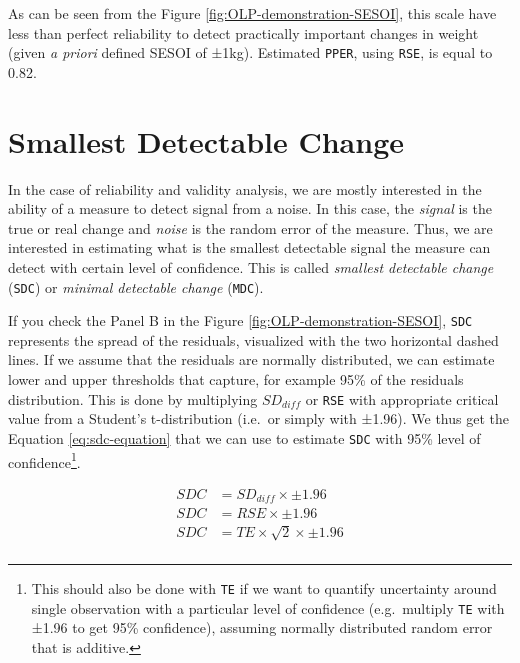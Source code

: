 \documentclass[
]{book}
\begin{document}
As can be seen from the Figure \ref{fig:OLP-demonstration-SESOI}, this scale have less than perfect reliability to detect practically important changes in weight (given \emph{a priori} defined SESOI of ±1kg). Estimated \texttt{PPER}, using \texttt{RSE}, is equal to 0.82.

\hypertarget{smallest-detectable-change}{%
\section{Smallest Detectable Change}\label{smallest-detectable-change}}

In the case of reliability and validity analysis, we are mostly interested in the ability of a measure to detect signal from a noise. In this case, the \emph{signal} is the true or real change and \emph{noise} is the random error of the measure. Thus, we are interested in estimating what is the smallest detectable signal the measure can detect with certain level of confidence. This is called \emph{smallest detectable change} (\texttt{SDC}) or \emph{minimal detectable change} (\texttt{MDC}).

If you check the Panel B in the Figure \ref{fig:OLP-demonstration-SESOI}, \texttt{SDC} represents the spread of the residuals, visualized with the two horizontal dashed lines. If we assume that the residuals are normally distributed, we can estimate lower and upper thresholds that capture, for example 95\% of the residuals distribution. This is done by multiplying \(SD_{diff}\) or \texttt{RSE} with appropriate critical value from a Student's t-distribution (i.e.~or simply with ±1.96). We thus get the Equation \eqref{eq:sdc-equation} that we can use to estimate \texttt{SDC} with 95\% level of confidence\footnote{This should also be done with \texttt{TE} if we want to quantify uncertainty around single observation with a particular level of confidence (e.g.~multiply \texttt{TE} with ±1.96 to get 95\% confidence), assuming normally distributed random error that is additive.}.

\begin{equation}
  \begin{split}
      SDC &= SD_{diff} \times \pm1.96 \\
      SDC &= RSE \times \pm1.96 \\
      SDC &= TE \times \sqrt{2} \times \pm1.96 \\
  \end{split}
  \label{eq:sdc-equation}
\end{equation}
\end{document}
